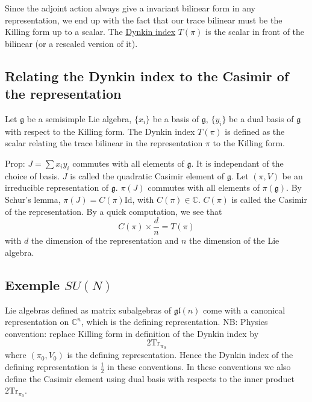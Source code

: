 \documentclass[a4paper]{book}
\theoremstyle{definition}
\theoremstyle{remark}
\begin{document}
Since the adjoint action always give a invariant bilinear form in any representation, we end up with the fact that our trace bilinear must be the Killing form up to a scalar. The \underline{Dynkin index} $T(\pi)$ is the scalar in front of the bilinear (or a rescaled version of it). 

\subsection{Relating the Dynkin index to the Casimir of the representation}
Let $\mathfrak g$ be a semisimple Lie algebra, $\{x_i\}$ be a basis of $\mathfrak{g}$, $\{y_i\}$ be a dual basis of $\mathfrak{g}$ with respect to the Killing form. The Dynkin index $T(\pi)$ is defined as the scalar relating the trace bilinear in the representation $\pi$ to the Killing form. \par \medskip 

Prop: $J = \sum x_i y_i$ commutes with all elements of $\mathfrak{g}$. It is independant of the choice of basis. $J$ is called the quadratic Casimir element of $\mathfrak{g}$. Let $(\pi, V)$ be an irreducible representation of $\mathfrak{g}$. $\pi(J)$ commutes with all elements of $\pi(\mathfrak{g})$. By Schur's lemma, $\pi(J) = C(\pi)\text{Id}$, with $C(\pi)\in \mathbb{C}$. $C(\pi)$ is called the Casimir of the representation. By a quick computation, we see that 
\begin{equation}
    C(\pi)\times \frac{d}{n} = T(\pi)
\end{equation}
with $d$ the dimension of the representation and $n$ the dimension of the Lie algebra. 

\subsection{Exemple $SU(N)$}

Lie algebras defined as matrix subalgebras of $\mathfrak{gl}(n)$ come with a canonical representation on $\mathbb{C}^n$, which is the defining representation. \newline 
NB: Physics convention: replace Killing form in definition of the Dynkin index by 
\begin{equation}
    2\text{Tr}_{\pi_0}
\end{equation}
where $(\pi_0, V_0)$ is the defining representation. Hence the Dynkin index of the defining representation is $\frac{1}{2}$ in these conventions. In these conventions we also define the Casimir element using dual basis with respects to the inner product $2\text{Tr}_{\pi_0}$. \par \medskip 
\end{document}
